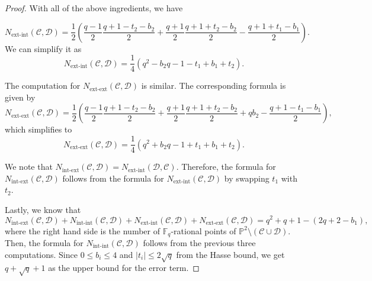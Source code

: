 \documentclass[10pt,a4paper]{amsart}
\begin{document}
\begin{proof}
    With all of the above ingredients, we have 

    $$N_{\mathrm{ext\text{-}int}}(\mathcal C,\mathcal D)=\frac{1}{2}\left(\frac{q-1}{2}\frac{q+1-t_2-b_2}{2}+\frac{q+1}{2}\frac{q+1+t_2-b_2}{2}-\frac{q+1+t_1-b_1}{2}\right).$$
    We can simplify it as 
    $$N_{\mathrm{ext\text{-}int}}(\mathcal C,\mathcal D) = \frac{1}{4}\left(q^2-b_2q-1-t_1+b_1+t_2\right).$$

    The computation for $N_{\mathrm{ext\text{-}ext}}(\mathcal C,\mathcal D)$ is similar. The corresponding formula is given by 
    $$N_{\mathrm{ext\text{-}ext}}(\mathcal C,\mathcal D) = \frac{1}{2}\left(\frac{q-1}{2}\frac{q+1-t_2-b_2}{2} + \frac{q+1}{2}\frac{q+1+t_2-b_2}{2} + qb_2-\frac{q+1-t_1-b_1}{2}\right),$$
    which simplifies to
    $$N_{\mathrm{ext\text{-}ext}}(\mathcal C,\mathcal D) = \frac{1}{4}(q^2+b_2q-1+t_1+b_1+t_2).$$

    We note that $N_{\mathrm{int\text{-}ext}}(\mathcal{C}, \mathcal{D}) = N_{\mathrm{ext\text{-}int}}(\mathcal{D}, \mathcal{C})$. Therefore, the formula for $N_{\mathrm{int\text{-}ext}}(\mathcal{C}, \mathcal{D})$ follows from the formula for $N_{\mathrm{ext\text{-}int}}(\mathcal{C}, \mathcal{D})$ by swapping $t_1$ with $t_2$. 

    Lastly, we know that 
    $$N_{\mathrm{int\text{-}ext}}(\mathcal{C}, \mathcal{D}) + N_{\mathrm{int\text{-}int}}(\mathcal{C}, \mathcal{D}) + N_{\mathrm{ext\text{-}int}}(\mathcal{C}, \mathcal{D}) + N_{\mathrm{ext\text{-}ext}}(\mathcal{C}, \mathcal{D}) = q^2+q+1-(2q+2-b_1),$$
    where the right hand side is the number of $\mathbb{F}_q$-rational points of $\mathbb{P}^2\setminus (\mathcal C \cup \mathcal D )$. Then, the formula for $N_{\mathrm{int\text{-}int}}(\mathcal{C}, \mathcal{D})$ follows from the previous three computations. Since $0\leq b_i\leq 4$ and $|t_i|\leq 2\sqrt{q}$ from the Hasse bound, we get $q+\sqrt{q}+1$ as the upper bound for the error term. 
\end{proof}
\end{document}
